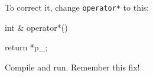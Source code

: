 To correct it, change \texttt{operator*} to this:



\begin{consolethree}[escapeinside=||]

int & operator*()

{

    return *p_;

}

\end{consolethree}



Compile and run. Remember this fix!

